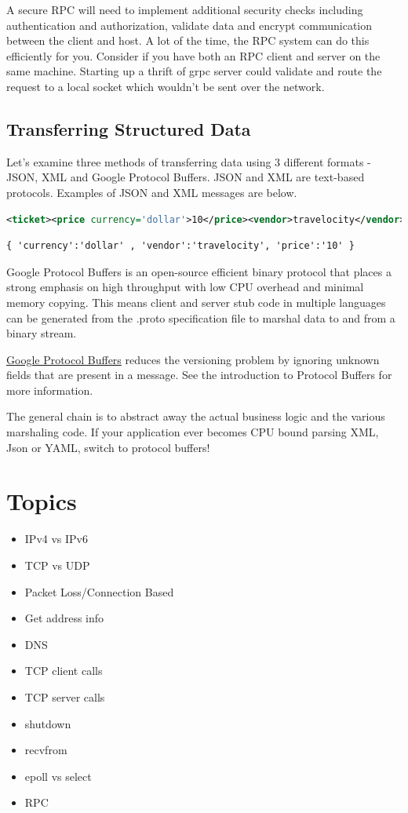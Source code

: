 A secure RPC will need to implement additional security checks including authentication and authorization, validate data and encrypt communication between the client and host.
A lot of the time, the RPC system can do this efficiently for you. Consider if you have both an RPC client and server on the same machine.
Starting up a thrift of grpc server could validate and route the request to a local socket which wouldn't be sent over the network.

\subsection{Transferring Structured Data}

Let's examine three methods of transferring data using 3 different formats - JSON, XML and Google Protocol Buffers.
JSON and XML are text-based protocols.
Examples of JSON and XML messages are below.

\begin{lstlisting}[language=XML]
<ticket><price currency='dollar'>10</price><vendor>travelocity</vendor></ticket>
\end{lstlisting}

\begin{lstlisting}
{ 'currency':'dollar' , 'vendor':'travelocity', 'price':'10' }
\end{lstlisting}

Google Protocol Buffers is an open-source efficient binary protocol that places a strong emphasis on high throughput with low CPU overhead and minimal memory copying.
This means client and server stub code in multiple languages can be generated from the .proto specification file to marshal data to and from a binary stream.

\href{https://developers.google.com/protocol-buffers/docs/overview}{Google Protocol Buffers} reduces the versioning problem by ignoring unknown fields that are present in a message.
See the introduction to Protocol Buffers for more information.

The general chain is to abstract away the actual business logic and the various marshaling code.
If your application ever becomes CPU bound parsing XML, Json or YAML, switch to protocol buffers!

\section{Topics}

\begin{itemize}
\item
  IPv4 vs IPv6
\item
  TCP vs UDP
\item
  Packet Loss/Connection Based
\item
  Get address info
\item
  DNS
\item
  TCP client calls
\item
  TCP server calls
\item
  shutdown
\item
  recvfrom
\item
  epoll vs select
\item
  RPC
\end{itemize}

